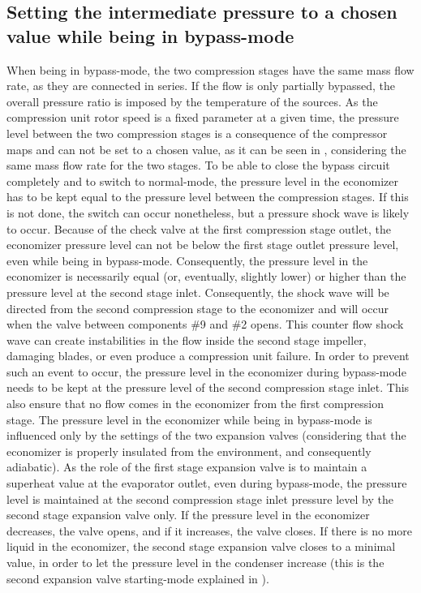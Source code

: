 \subsection{Setting the intermediate pressure to a chosen value while being in bypass-mode}
\label{sec:bwp-bypass-mode-Pint-issue}

When being in bypass-mode, the two compression stages have the same
mass flow rate, as they are connected in series. If the flow is only
partially bypassed, the overall pressure ratio is imposed by the
temperature of the sources. As the compression unit rotor speed is a
fixed parameter at a given time, the pressure level between the two
compression stages is a consequence of the compressor maps and can not
be set to a chosen value, as it can be seen in
, considering the same mass flow rate
for the two stages. To be able to close the bypass circuit completely
and to switch to normal-mode, the pressure level in the economizer has
to be kept equal to the pressure level between the compression
stages. If this is not done, the switch can occur nonetheless, but a
pressure shock wave is likely to occur. Because of the check valve at
the first compression stage outlet, the economizer pressure level can
not be below the first stage outlet pressure level, even while being
in bypass-mode. Consequently, the pressure level in the economizer is
necessarily equal (or, eventually, slightly lower) or higher than the
pressure level at the second stage inlet. Consequently, the shock wave
will be directed from the second compression stage to the economizer
and will occur when the valve between components \#9 and \#2
opens. This counter flow shock wave can create instabilities in the
flow inside the second stage impeller, damaging blades, or even
produce a compression unit failure. In order to prevent such an event
to occur, the pressure level in the economizer during bypass-mode
needs to be kept at the pressure level of the second compression stage
inlet. This also ensure that no flow comes in the economizer from the
first compression stage.  The pressure level in the economizer while
being in bypass-mode is influenced only by the settings of the two
expansion valves (considering that the economizer is properly
insulated from the environment, and consequently adiabatic). As the
role of the first stage expansion valve is to maintain a superheat
value at the evaporator outlet, even during bypass-mode, the pressure
level is maintained at the second compression stage inlet pressure
level by the second stage expansion valve only. If the pressure level
in the economizer decreases, the valve opens, and if it increases, the
valve closes. If there is no more liquid in the economizer, the second
stage expansion valve closes to a minimal value, in order to let the
pressure level in the condenser increase (this is the second expansion
valve starting-mode explained in ).

